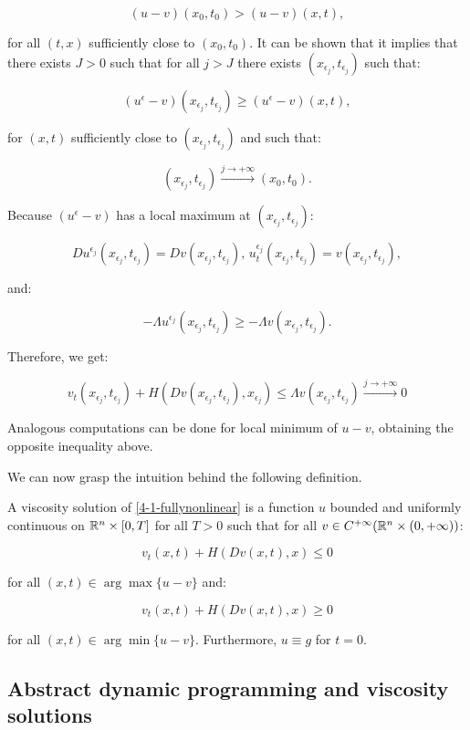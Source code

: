 \[(u-v)(x_0,t_0) > (u-v)(x,t),\]

for all $(t,x)$ sufficiently close to $(x_0,t_0)$. It can be shown that it implies that there exists $J>0$ such that for all 
$j>J$ there exists $(x_{\epsilon_j},t_{\epsilon_j})$ such that:

\[(u^{\epsilon}-v)(x_{\epsilon_j},t_{\epsilon_j}) \geq (u^{\epsilon}-v)(x,t),\]

for $(x,t)$ sufficiently close to $(x_{\epsilon_j},t_{\epsilon_j})$ and such that:

\[(x_{\epsilon_j},t_{\epsilon_j})\xrightarrow{j\to+\infty}(x_0,t_0).\]

Because $(u^{\epsilon}-v)$ has a local maximum at $(x_{\epsilon_j},t_{\epsilon_j})$:

\[Du^{\epsilon_j}(x_{\epsilon_j},t_{\epsilon_j})=Dv(x_{\epsilon_j},t_{\epsilon_j}),\,u^{\epsilon_j}_t(x_{\epsilon_j},t_{\epsilon_j}) =v(x_{\epsilon_j},t_{\epsilon_j}),\]

and:

\[-\Lambda u^{\epsilon_j}(x_{\epsilon_j},t_{\epsilon_j}) \geq -\Lambda v(x_{\epsilon_j},t_{\epsilon_j}).\]

Therefore, we get:

\[v_t(x_{\epsilon_j},t_{\epsilon_j}) +H(Dv(x_{\epsilon_j},t_{\epsilon_j}) ,x_{\epsilon_j})\leq \Lambda v(x_{\epsilon_j},t_{\epsilon_j}) \xrightarrow{j\to+\infty}0\]

Analogous computations can be done for local minimum of $u-v$, obtaining the opposite inequality above.

We can now grasp the intuition behind the following definition.

\begin{definition}
    A viscosity solution of \ref{4-1-fullynonlinear} is a function $u$ bounded and uniformly continuous on $\mathbb{R}^n\times[0,T]$ for all $T>0$ such that 
    for all $v\in C^{+\infty}(\mathbb{R}^n\times(0,+\infty))$:

    \[v_t(x,t)+H(Dv(x,t),x)\leq0\]

    for all $(x,t)\in\arg \max\{u-v\}$ and:

    \[v_t(x,t)+H(Dv(x,t),x)\geq0\]

    for all $(x,t)\in\arg \min\{u-v\}$. Furthermore, $u\equiv g$ for $t=0$. 
\end{definition}

\subsection{Abstract dynamic programming and viscosity solutions}

